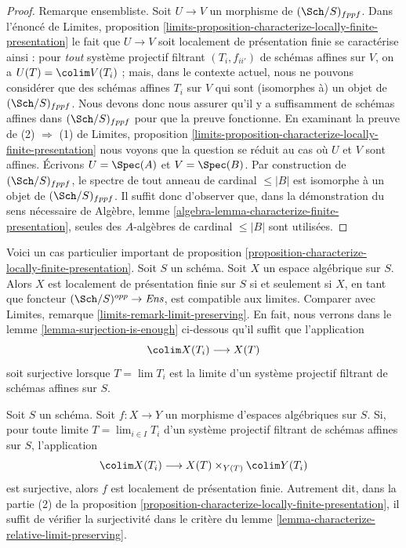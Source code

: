\begin{proof}
\medskip\noindent
Remarque ensembliste. Soit $U \to V$ un morphisme de
$(\Sch/S)_{fppf}$. Dans l'énoncé de
Limites, proposition
\ref{limits-proposition-characterize-locally-finite-presentation}
le fait que $U \to V$ soit localement de présentation finie
se caractérise ainsi : pour {\it tout} système projectif filtrant $(T_i, f_{ii'})$ de schémas affines
sur $V$, on a $U(T) = \colim V(T_i)$ ; mais, dans le contexte actuel,
nous ne pouvons considérer que des schémas affines $T_i$ sur $V$ qui sont (isomorphes à)
un objet de $(\Sch/S)_{fppf}$. Nous devons donc nous assurer qu'il y a suffisamment
de schémas affines dans $(\Sch/S)_{fppf}$ pour que la preuve fonctionne.
En examinant la preuve de (2) $\Rightarrow$ (1) de
Limites, proposition
\ref{limits-proposition-characterize-locally-finite-presentation}
nous voyons que la question se réduit au cas où $U$ et $V$ sont affines.
Écrivons $U = \Spec(A)$ et $V = \Spec(B)$. Par construction
de $(\Sch/S)_{fppf}$, le spectre de tout anneau de cardinal
$\leq |B|$ est isomorphe à un objet de $(\Sch/S)_{fppf}$.
Il suffit donc d'observer que, dans la démonstration du sens nécessaire de
Algèbre, lemme \ref{algebra-lemma-characterize-finite-presentation},
seules des $A$-algèbres de cardinal $\leq |B|$ sont utilisées.
\end{proof}

\begin{remark}
\label{remark-limit-preserving}
Voici un cas particulier important de
proposition \ref{proposition-characterize-locally-finite-presentation}.
Soit $S$ un schéma. Soit $X$ un espace algébrique sur $S$.
Alors $X$ est localement de présentation finie sur $S$ si et seulement
si $X$, en tant que foncteur $(\Sch/S)^{opp} \to \textit{Ens}$,
est compatible aux limites. Comparer avec
Limites, remarque \ref{limits-remark-limit-preserving}.
En fait, nous verrons dans le lemme \ref{lemma-surjection-is-enough}
ci-dessous qu'il suffit que l'application
$$
\colim X(T_i) \longrightarrow X(T)
$$
soit surjective lorsque $T = \lim T_i$ est la limite d'un système projectif filtrant de
schémas affines sur $S$.
\end{remark}

\begin{lemma}
\label{lemma-surjection-is-enough}
Soit $S$ un schéma.
Soit $f : X \to Y$ un morphisme d'espaces algébriques sur $S$.
Si, pour toute limite $T = \lim_{i \in I} T_i$ d'un système projectif filtrant
de schémas affines sur $S$, l'application
$$
\colim X(T_i) \longrightarrow X(T) \times_{Y(T)} \colim Y(T_i)
$$
est surjective, alors $f$ est localement de présentation finie.
Autrement dit, dans la partie (2) de la
proposition \ref{proposition-characterize-locally-finite-presentation},
il suffit de vérifier la surjectivité dans le critère du
lemme \ref{lemma-characterize-relative-limit-preserving}.
\end{lemma}

